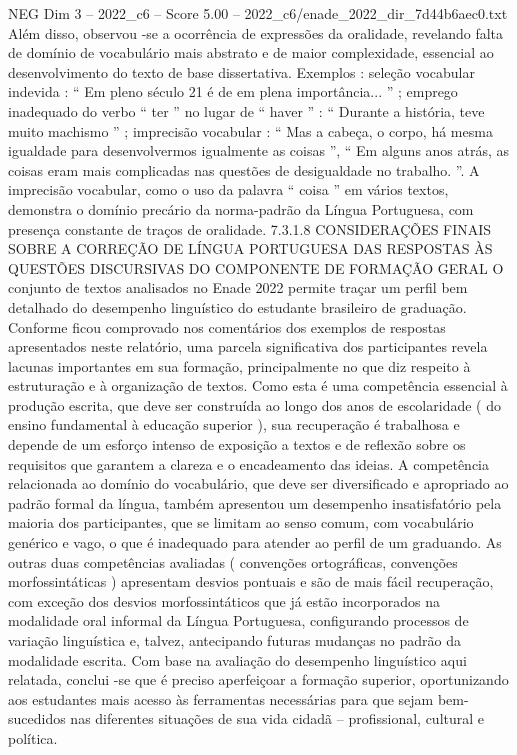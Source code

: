 \begin{textsample}{NEG Dim 3 – 2022\_c6 – Score 5.00 – 2022\_c6/enade\_2022\_dir\_7d44b6aec0.txt}
Além disso, observou -se a ocorrência de expressões da oralidade, revelando falta de domínio de vocabulário mais abstrato e de maior complexidade, essencial ao desenvolvimento do texto de base dissertativa.
Exemplos : seleção vocabular indevida : “ Em pleno século 21 é de em plena importância... ” ; emprego inadequado do verbo “ ter ” no lugar de “ haver ” : “ Durante a história, teve muito machismo ” ; imprecisão vocabular : “ Mas a cabeça, o corpo, há mesma igualdade para desenvolvermos igualmente as coisas ”, “ Em alguns anos atrás, as coisas eram mais complicadas nas questões de desigualdade no trabalho. ”.
A imprecisão vocabular, como o uso da palavra “ coisa ” em vários textos, demonstra o domínio precário da norma-padrão da Língua Portuguesa, com presença constante de traços de oralidade. 7.3.1.8 CONSIDERAÇÕES FINAIS SOBRE A CORREÇÃO DE LÍNGUA PORTUGUESA DAS RESPOSTAS ÀS QUESTÕES DISCURSIVAS DO COMPONENTE DE FORMAÇÃO GERAL O conjunto de textos analisados no Enade 2022 permite traçar um perfil bem detalhado do desempenho linguístico do estudante brasileiro de graduação.
Conforme ficou comprovado nos comentários dos exemplos de respostas apresentados neste relatório, uma parcela significativa dos participantes revela lacunas importantes em sua formação, principalmente no que diz respeito à estruturação e à organização de textos.
Como esta é uma competência essencial à produção escrita, que deve ser construída ao longo dos anos de escolaridade ( do ensino fundamental à educação superior ), sua recuperação é trabalhosa e depende de um esforço intenso de exposição a textos e de reflexão sobre os requisitos que garantem a clareza e o encadeamento das ideias.
A competência relacionada ao domínio do vocabulário, que deve ser diversificado e apropriado ao padrão formal da língua, também apresentou um desempenho insatisfatório pela maioria dos participantes, que se limitam ao senso comum, com vocabulário genérico e vago, o que é inadequado para atender ao perfil de um graduando.
As outras duas competências avaliadas ( convenções ortográficas, convenções morfossintáticas ) apresentam desvios pontuais e são de mais fácil recuperação, com exceção dos desvios morfossintáticos que já estão incorporados na modalidade oral informal da Língua Portuguesa, configurando processos de variação linguística e, talvez, antecipando futuras mudanças no padrão da modalidade escrita.
Com base na avaliação do desempenho linguístico aqui relatada, conclui -se que é preciso aperfeiçoar a formação superior, oportunizando aos estudantes mais acesso às ferramentas necessárias para que sejam bem-sucedidos nas diferentes situações de sua vida cidadã – profissional, cultural e política.

\end{textsample}
